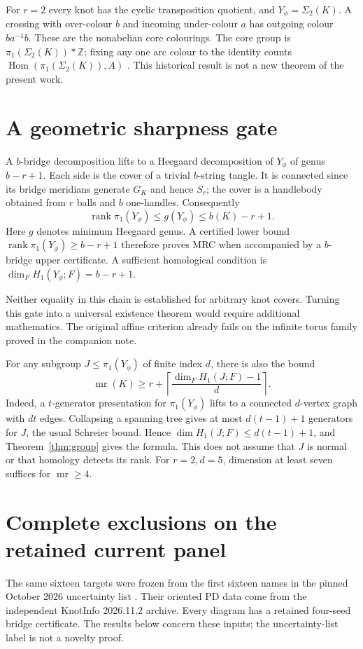 \documentclass[11pt]{article}
\newcommand{\mr}{\operatorname{mr}}
\newcommand{\rk}{\operatorname{rank}}
\newcommand{\Hom}{\operatorname{Hom}}
\newcommand{\Z}{\mathbb Z}
\begin{document}
For $r=2$ every knot has the cyclic transposition quotient, and
$Y_\phi=\Sigma_2(K)$. A crossing with over-colour $b$ and incoming
under-colour $a$ has outgoing colour $ba^{-1}b$. These are the
nonabelian core colourings. The core group is
$\pi_1(\Sigma_2(K))*\Z$; fixing any one arc colour to the identity
counts $\Hom(\pi_1(\Sigma_2(K)),A)$ \cite{core}. This historical result
is not a new theorem of the present work.

\section{A geometric sharpness gate}

A $b$-bridge decomposition lifts to a Heegaard decomposition of
$Y_\phi$ of genus $b-r+1$. Each side is the cover of a trivial
$b$-string tangle. It is connected since its bridge meridians generate
$G_K$ and hence $S_r$; the cover is a handlebody obtained from $r$
balls and $b$ one-handles. Consequently
\[
       \rk\pi_1(Y_\phi)\le g(Y_\phi)\le b(K)-r+1.
\]
Here $g$ denotes minimum Heegaard genus. A certified lower bound
$\rk\pi_1(Y_\phi)\ge b-r+1$ therefore proves MRC when accompanied by
a $b$-bridge upper certificate. A sufficient homological condition is
$\dim_FH_1(Y_\phi;F)=b-r+1$.

Neither equality in this chain is established for arbitrary knot
covers. Turning this gate into a universal existence theorem would
require additional mathematics. The original affine criterion already
fails on the infinite torus family proved in the companion note.

For any subgroup $J\le\pi_1(Y_\phi)$ of finite index $d$, there is also
the bound
\[
                 \mr(K)\ge r+\left\lceil\frac{\dim_F H_1(J;F)-1}{d}\right\rceil.
\]
Indeed, a $t$-generator presentation for $\pi_1(Y_\phi)$ lifts to a
connected $d$-vertex graph with $dt$ edges. Collapsing a spanning tree
gives at most $d(t-1)+1$ generators for $J$, the usual Schreier bound.
Hence $\dim H_1(J;F)\le d(t-1)+1$, and Theorem~\ref{thm:group}
gives the formula. This does not assume that $J$ is normal or that
homology detects its rank. For $r=2,d=5$, dimension at least seven
suffices for $\mr\ge4$.

\section{Complete exclusions on the retained current panel}

The same sixteen targets were frozen from the first sixteen names in
the pinned October 2026 uncertainty list \cite{deposit}. Their oriented
PD data come from the independent KnotInfo 2026.11.2 archive. Every
diagram has a retained four-seed bridge certificate. The results below
concern these inputs; the uncertainty-list label is not a novelty proof.
\end{document}
